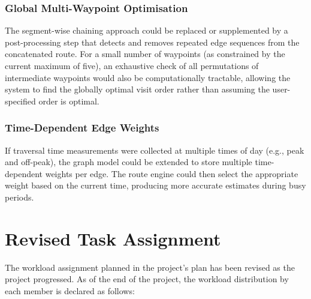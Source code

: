 \documentclass[a4paper,10pt]{amsart}
\begin{document}


\subsubsection{Global Multi-Waypoint Optimisation}

The segment-wise chaining approach could be replaced or supplemented by a post-processing step that detects and removes repeated edge sequences from the concatenated route.
For a small number of waypoints (as constrained by the current maximum of five), an exhaustive check of all permutations of intermediate waypoints would also be computationally tractable, allowing the system to find the globally optimal visit order rather than assuming the user-specified order is optimal.

\subsubsection{Time-Dependent Edge Weights}

If traversal time measurements were collected at multiple times of day (e.g., peak and off-peak), the graph model could be extended to store multiple time-dependent weights per edge.
The route engine could then select the appropriate weight based on the current time, producing more accurate estimates during busy periods.



\appendix \clearpage
\section{Revised Task Assignment}

The workload assignment planned in the project's plan has been revised as the project progressed.
As of the end of the project, the workload distribution by each member is declared as follows:
\end{document}
